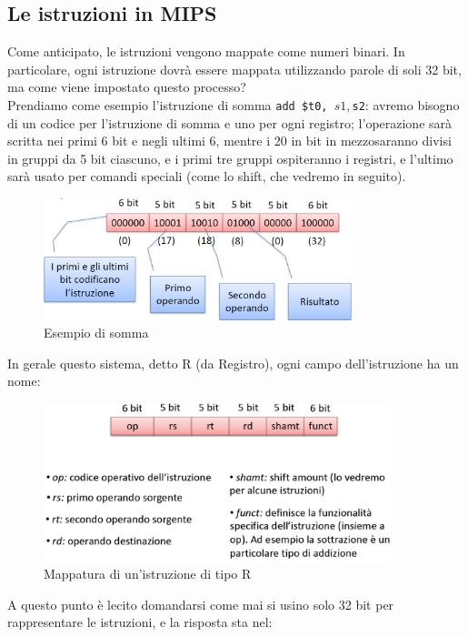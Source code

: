 \documentclass[class=book, crop=false]{standalone}
\begin{document}
\subsection{Le istruzioni in MIPS}
Come anticipato, le istruzioni vengono mappate come numeri binari. In particolare, ogni istruzione dovrà essere mappata utilizzando parole di soli 32 bit, ma come viene impostato questo processo?\\
Prendiamo come esempio l'istruzione di somma \texttt{add \$t0, $s1, $s2}: avremo bisogno di un codice per l'istruzione di somma e uno per ogni registro; l'operazione sarà scritta nei primi 6 bit e negli ultimi 6, mentre i 20 in bit in mezzosaranno divisi in gruppi da 5 bit ciascuno, e i primi tre gruppi ospiteranno i registri, e l'ultimo sarà usato per comandi speciali (come lo shift, che vedremo in seguito).
\begin{figure}[H]
	\centering
	\includegraphics[width=0.8\textwidth,keepaspectratio]{istruzioni.png}
	\caption{Esempio di somma}
\end{figure}
In gerale questo sistema, detto R (da Registro), ogni campo dell'istruzione ha un nome:
\begin{figure}[H]
	\centering
	\includegraphics[width=0.9\textwidth,keepaspectratio]{mappatura.png}
	\caption{Mappatura di un'istruzione di tipo R}
\end{figure}
A questo punto è lecito domandarsi come mai si usino solo 32 bit per rappresentare le istruzioni, e la risposta sta nel:
\end{document}
